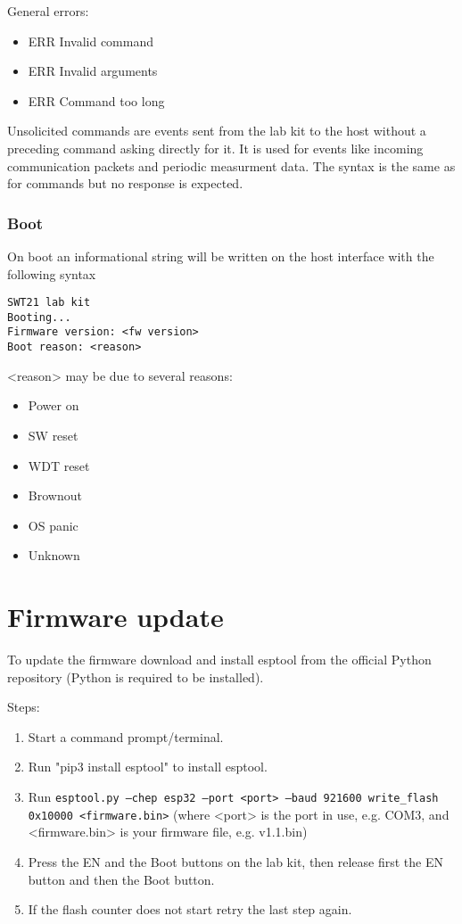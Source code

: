 \documentclass{article}[a4paper]
\begin{document}
General errors:
\begin{itemize}[noitemsep]
\item ERR Invalid command
\item ERR Invalid arguments
\item ERR Command too long
\end{itemize}

Unsolicited commands are events sent from the lab kit to the host without a
preceding command asking directly for it. It is used for events like incoming
communication packets and periodic measurment data. The syntax is the same as
for commands but no response is expected.

\subsubsection{Boot}
On boot an informational string will be written on the host interface with
the following syntax

\begin{verbatim}
SWT21 lab kit
Booting...
Firmware version: <fw version>
Boot reason: <reason>
\end{verbatim}

<reason> may be due to several reasons:
\begin{itemize}[noitemsep]
\item Power on
\item SW reset
\item WDT reset
\item Brownout
\item OS panic
\item Unknown
\end{itemize}

\section{Firmware update}
To update the firmware download and install esptool from the official Python
repository (Python is required to be installed).

Steps:
\begin{enumerate}
\item Start a command prompt/terminal.
\item Run "pip3 install esptool" to install esptool.
\item Run \texttt{esptool.py --chep esp32 --port <port> --baud 921600 write\_flash 0x10000 <firmware.bin>} (where <port> is the port in use, e.g. COM3, and <firmware.bin> is your firmware file, e.g. v1.1.bin)
\item Press the EN and the Boot buttons on the lab kit, then release first the EN
      button and then the Boot button.
\item If the flash counter does not start retry the last step again.
\end{enumerate}
\end{document}

